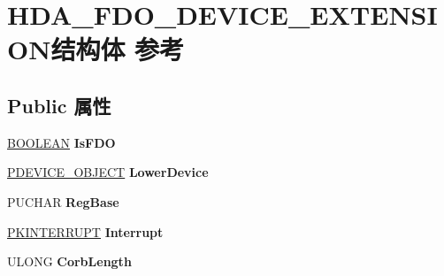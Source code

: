 \hypertarget{struct_h_d_a___f_d_o___d_e_v_i_c_e___e_x_t_e_n_s_i_o_n}{}\section{H\+D\+A\+\_\+\+F\+D\+O\+\_\+\+D\+E\+V\+I\+C\+E\+\_\+\+E\+X\+T\+E\+N\+S\+I\+O\+N结构体 参考}
\label{struct_h_d_a___f_d_o___d_e_v_i_c_e___e_x_t_e_n_s_i_o_n}
\subsection*{Public 属性}
\begin{DoxyCompactItemize}
\item 
\mbox{\label{struct_h_d_a___f_d_o___d_e_v_i_c_e___e_x_t_e_n_s_i_o_n_ae1b8361d8df20b9030f9839b16fd35c0}} 
\hyperlink{_processor_bind_8h_a112e3146cb38b6ee95e64d85842e380a}{B\+O\+O\+L\+E\+AN} {\bfseries Is\+F\+DO}
\item 
\mbox{\label{struct_h_d_a___f_d_o___d_e_v_i_c_e___e_x_t_e_n_s_i_o_n_a173f5eec7b402a49085c5de54bfbaac9}} 
\hyperlink{struct___d_e_v_i_c_e___o_b_j_e_c_t}{P\+D\+E\+V\+I\+C\+E\+\_\+\+O\+B\+J\+E\+CT} {\bfseries Lower\+Device}
\item 
\mbox{\label{struct_h_d_a___f_d_o___d_e_v_i_c_e___e_x_t_e_n_s_i_o_n_a1c34581736b8e870e61662e7766a8dbf}} 
P\+U\+C\+H\+AR {\bfseries Reg\+Base}
\item 
\mbox{\label{struct_h_d_a___f_d_o___d_e_v_i_c_e___e_x_t_e_n_s_i_o_n_adf51ab92f117f559d3e16d49fa1519b6}} 
\hyperlink{struct___k_i_n_t_e_r_r_u_p_t}{P\+K\+I\+N\+T\+E\+R\+R\+U\+PT} {\bfseries Interrupt}
\item 
\mbox{\label{struct_h_d_a___f_d_o___d_e_v_i_c_e___e_x_t_e_n_s_i_o_n_aa0f2bedbf0fcb9401a067122c5c71143}} 
U\+L\+O\+NG {\bfseries Corb\+Length}
\item 
\mbox{\label{struct_h_d_a___f_d_o___d_e_v_i_c_e___e_x_t_e_n_s_i_o_n_a802246ef89be667ad18b9a5bddcad30a}} 

\end{DoxyCompactItemize}
